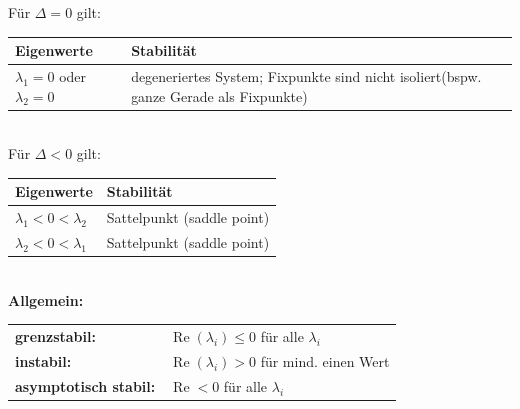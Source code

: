 Für $\Delta = 0$ gilt: \\
\begin{tabular}{|p{5cm}|p{13cm}|}
\hline \textbf{Eigenwerte} & \textbf{Stabilität} \\ 
\hline $\lambda_1 = 0$ oder $\lambda_2 = 0$ & degeneriertes System; Fixpunkte sind nicht isoliert(bspw. ganze Gerade als Fixpunkte) \\ 
\hline 
\end{tabular} \\

Für $\Delta < 0$ gilt: \\
\begin{tabular}{|p{5cm}|p{13cm}|}
\hline \textbf{Eigenwerte} & \textbf{Stabilität} \\ 
\hline $\lambda_1 < 0 < \lambda_2$ & Sattelpunkt (saddle point) \\
\hline $\lambda_2 < 0 < \lambda_1$ & Sattelpunkt (saddle point) \\ 
\hline 
\end{tabular} \\

\textbf{Allgemein:}\\
\begin{tabular}{ll}
	\textbf{grenzstabil:} \qquad & $\operatorname{Re}(\lambda_i) \leq 0$ für alle $\lambda_i$ \\
	\textbf{instabil:} & $\operatorname{Re}(\lambda_i) > 0$ für mind. einen Wert \\
	\textbf{asymptotisch stabil:} &$\operatorname{Re} < 0$ für alle $\lambda_i$ \\
\end{tabular}\\ \\

